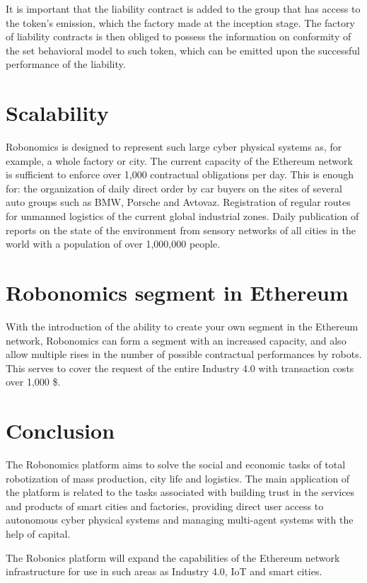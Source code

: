 \documentclass{article}
\begin{document}
It is important that the liability contract is added to the group that has access to the token's emission, which the factory made at the inception stage. The factory of liability contracts is then obliged to possess the information on conformity of the set behavioral model to such token, which can be emitted upon the successful performance of the liability.

\section{Scalability}

Robonomics is designed to represent such large cyber physical systems as, for example, a whole factory or city. The current capacity of the Ethereum network is sufficient to enforce over 1,000 contractual obligations per day. This is enough for:
the organization of daily direct order by car buyers on the sites of several auto groups such as BMW, Porsche and Avtovaz.
Registration of regular routes for unmanned logistics of the current global industrial zones.
Daily publication of reports on the state of the environment from sensory networks of all cities in the world with a population of over 1,000,000 people.

\section{Robonomics segment in Ethereum}

With the introduction of the ability to create your own segment in the Ethereum network, Robonomics can form a segment with an increased capacity, and also allow multiple rises in the number of possible contractual performances by robots. This serves to cover the request of the entire Industry 4.0 with transaction costs over 1,000 \$.

\section{Conclusion}

The Robonomics platform aims to solve the social and economic tasks of total robotization of mass production, city life and logistics. The main application of the platform is related to the tasks associated with building trust in the services and products of smart cities and factories, providing direct user access to autonomous cyber physical systems and managing multi-agent systems with the help of capital.

The Robonics platform will expand the capabilities of the Ethereum network infrastructure for use in such areas as Industry 4.0, IoT and smart cities.
\newpage
\printbibliography
\newpage
\end{document}
